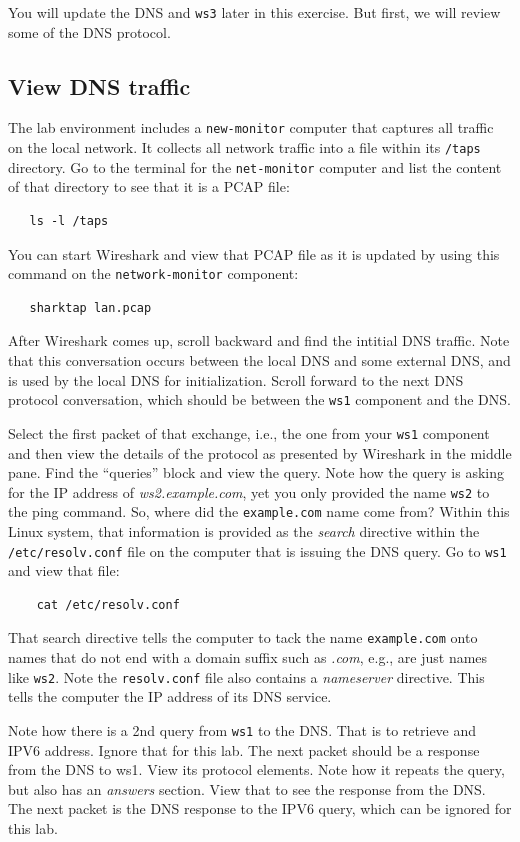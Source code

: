 You will update the DNS and {\tt ws3} later in this exercise.  But first, we will review some of the DNS protocol.

\subsection{View DNS traffic}
The lab environment includes a {\tt new-monitor} computer that captures all traffic on the local network.
It collects all network traffic into a file within its {\tt /taps} directory.  Go to the terminal for the
{\tt net-monitor} computer and list the content of that directory to see that it is a PCAP file:
\begin{verbatim}
   ls -l /taps
\end{verbatim}
\noindent You can start Wireshark and view that PCAP file as it is updated by using this command on the
{\tt network-monitor} component:
\begin{verbatim}
   sharktap lan.pcap
\end{verbatim}
After Wireshark comes up, scroll backward and find the intitial DNS traffic.  Note that this conversation
occurs between the local DNS and some external DNS, and is used by the local DNS for initialization.  Scroll forward to the next DNS protocol conversation, which should be between the {\tt ws1} component and the DNS.

Select the first packet of that exchange, i.e., the one from your {\tt ws1} component and then view the
details of the protocol as presented by Wireshark in the middle pane.  Find the ``queries'' block and
view the query.   Note how the query is asking for the IP address of \textit{ws2.example.com}, yet you only
provided the name {\tt ws2} to the ping command.  So, where did the {\tt example.com} name come from?  Within
this Linux system, that information is provided as the \textit{search} directive within the 
{\tt /etc/resolv.conf} file on the computer that is issuing the DNS query.  Go to {\tt ws1} and view that file:
\begin{verbatim}
    cat /etc/resolv.conf
\end{verbatim}
\noindent That search directive tells the computer to tack the name {\tt example.com} onto names that do
not end with a domain suffix such as \textit{.com}, e.g., are just names like {\tt ws2}.  Note the {\tt resolv.conf} file
also contains a \textit{nameserver} directive.  This tells the computer the IP address of its DNS service.

Note how there is a 2nd query from {\tt ws1} to the DNS.  That is to retrieve and IPV6 address.  Ignore that 
for this lab.  The next packet should be a response from the DNS to ws1.  View its protocol elements.
Note how it repeats the query, but also has an \textit{answers} section.  View that to see the response from
the DNS.  The next packet is the DNS response to the IPV6 query, which can be ignored for this lab.

